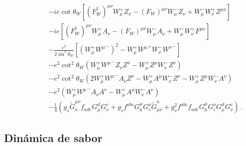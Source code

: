 \begin{frame}{}




\begin{align}
  \phantom{\mathcal{L}_{\text{1 gen}}=}
&-ie\cot\theta_W\left[(F_W^\dagger)^{\mu\nu}W_\mu^+ Z_\nu-(F_W)^{\mu\nu}W_\mu^- Z_\nu+W_\mu^-W_\nu^+Z^{\mu\nu}\right]\nonumber\\
&-ie\left[(F_W^\dagger)^{\mu\nu}W_\mu^+ A_\nu-(F_W)^{\mu\nu}W_\mu^- A_\nu+W_\mu^-W_\nu^+F^{\mu\nu}\right]\nonumber\\
&-\frac{e^2}{2\sin^2\theta_W}\left[\left(W_\mu^+{W^\mu}^-\right)^2-W_\mu^+{W^\mu}^+W_\nu^-{W^\nu}^-\right]\nonumber\\
&-e^2\cot^2\theta_W\left(W_\mu^+{W^\mu}^-Z_\nu Z^\nu-W_\mu^+Z^\mu W_\nu^-Z^\nu\right)\nonumber\\
&-e^2\cot^2\theta_W\left(2W_\mu^+{W^\mu}^-A_\nu Z^\nu-W_\mu^+A^\mu W_\nu^-Z^\nu-W_\mu^+Z^\mu W_\nu^-A^\nu\right)\nonumber\\
&-e^2\left(W_\mu^+{W^\mu}^-A_\nu A^\nu-W_\mu^+A^\mu W_\nu^-A^\nu\right)\nonumber\\
&- \frac{1}{4}\left(g_s\widetilde{G}^{\mu\nu}_af_{a d e}G^d_\mu G^e_\nu
    +g_sf^{a b c}G_b^\mu G_c^\nu\widetilde{G}_{\mu\nu}^a
    +g_s^2f^{a b c}f_{a d e}G_b^\mu G_c^\nu G^d_\mu G^e_\nu\right)\,.
\end{align}
     
     
\end{frame}

\subsection{Dinámica de sabor}
\label{sec:dinamica-de-sabor}

